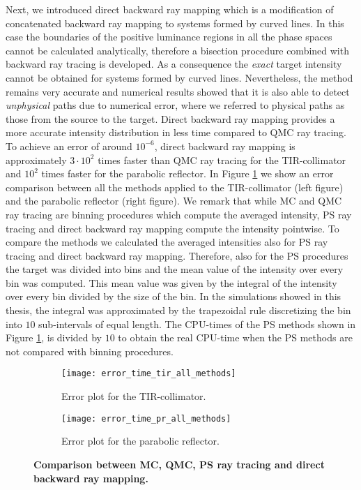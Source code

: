 Next, we introduced direct backward ray mapping which is a modification of concatenated backward ray mapping to systems formed by curved lines. In this case the boundaries of the positive luminance regions in all the phase spaces cannot be calculated analytically, therefore a bisection procedure combined with backward ray tracing is developed. As a consequence the \textit{exact} target intensity cannot be obtained for systems formed by curved lines. Nevertheless, the method remains very accurate and numerical results showed that it is also able to detect \textit{unphysical} paths due to numerical error, where we referred to physical paths as those from the source to the target. Direct backward ray mapping provides a more accurate intensity distribution in less time compared to QMC ray tracing. To achieve an error of around $10^{-6}$, direct backward ray mapping is approximately $3\cdot10^2$ times faster than QMC ray tracing for the TIR-collimator and $10^2$ times faster for the parabolic reflector. In Figure \ref{fig:error_comparison} we show an error comparison between all the methods applied to the TIR-collimator (left figure) and the parabolic reflector (right figure). 
We remark that while MC and QMC ray tracing are binning procedures which compute the averaged intensity, PS ray tracing and direct backward ray mapping compute the intensity pointwise. To compare the methods we calculated the averaged intensities also for PS ray tracing and direct backward ray mapping. Therefore, also for the PS procedures the target was divided into bins and the mean value of the intensity over every bin was computed. This mean value was given by the integral of the intensity over every bin divided by the size of the bin. In the simulations showed in this thesis, the integral was approximated by the trapezoidal rule discretizing the bin into $10$ sub-intervals of equal length. The CPU-times of the PS methods shown in Figure \ref{fig:error_comparison}, is divided by $10$ to obtain the real CPU-time when the PS methods are not compared with binning procedures.
\begin{figure}[h]
\label{fig:error_comparison}
 \begin{subfigure}[t]{0.49\textwidth}
\centering
    \texttt{[image: error\_time\_tir\_all\_methods]}
    \caption{Error plot for the TIR-collimator.}
\end{subfigure}
\hfill
\begin{subfigure}[t]{0.49\textwidth}
\centering
    \texttt{[image: error\_time\_pr\_all\_methods]}
    \caption{Error plot for the parabolic reflector.}
\end{subfigure}
\caption{\textbf{Comparison between MC, QMC, PS ray tracing and direct backward ray mapping.}}
\label{fig:error_comparison}
\end{figure}
